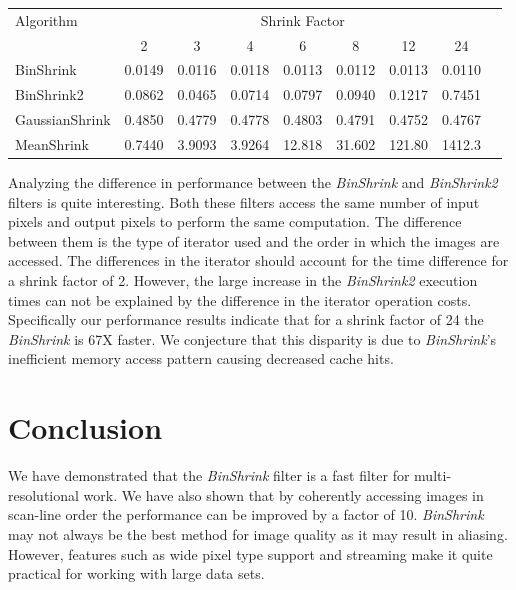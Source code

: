 \documentclass{InsightArticle}
\begin{document}
\begin{table}
\begin{center}
\begin{tabular}{l|*{7}{c}r}
Algorithm & \multicolumn{7}{c}{Shrink Factor} \\
  &            2 & 3 & 4 & 6 & 8 & 12 & 24 \\
\hline
BinShrink &     0.0149 & 0.0116 & 0.0118 & 0.0113 & 0.0112 & 0.0113 & 0.0110\\
BinShrink2 &    0.0862 & 0.0465 & 0.0714 & 0.0797 & 0.0940 & 0.1217 & 0.7451\\
GaussianShrink &0.4850 & 0.4779 & 0.4778 & 0.4803 & 0.4791 & 0.4752 & 0.4767\\
MeanShrink &    0.7440 & 3.9093 & 3.9264 & 12.818 & 31.602 & 121.80 & 1412.3\\
\end{tabular}
\label{tab:ShrinkPerformance}
\end{center}
\end{table}

Analyzing the difference in performance between the \textit{BinShrink}
and \textit{BinShrink2} filters is quite interesting. Both these
filters access the same number of input pixels and output pixels to
perform the same computation. The difference between them is the type of iterator
used and the order in which the images are accessed. The differences
in the iterator should account for the time difference
for a shrink factor of 2. However, the large increase in the
\textit{BinShrink2} execution times can not be explained by the
difference in the iterator operation costs. Specifically our
performance results indicate that for a shrink factor of 24 the
\textit{BinShrink} is 67X faster. We conjecture that this disparity is
due to \textit{BinShrink}'s inefficient memory access pattern
causing decreased cache hits.

\section{Conclusion}

We have demonstrated that the \textit{BinShrink} filter is a fast
filter for multi-resolutional work. We have also shown that
by coherently accessing images in scan-line order the performance can
be improved by a factor of 10.
\textit{BinShrink} may not always be the best method for image quality as it
may result in aliasing. However, features such as wide pixel type
support and streaming make it quite practical for working with large
data sets.




\end{document}
